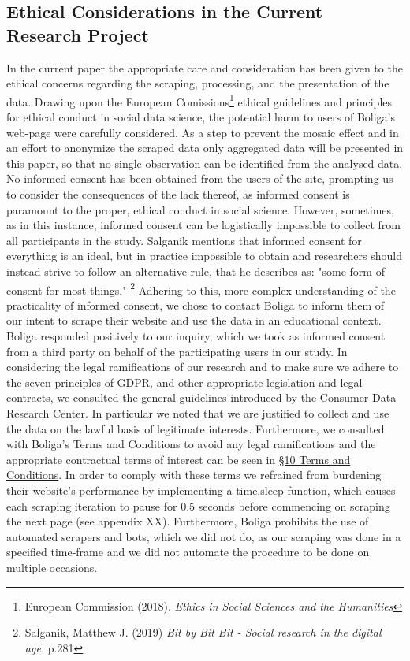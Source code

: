 \documentclass[12pt,a4paper]{article}
\begin{document}
\subsection{Ethical Considerations in the Current Research Project}
In the current paper the appropriate care and consideration has been given to the ethical concerns regarding the scraping, processing, and the presentation of the data. Drawing upon the European Comissions\footnote{European Commission (2018). \textit{Ethics in Social Sciences and the Humanities}} ethical guidelines and principles for ethical conduct in social data science, the potential harm to users of Boliga's web-page were carefully considered. As a step to prevent the mosaic effect and in an effort to anonymize the scraped data only aggregated data will be presented in this paper, so that no single observation can be identified from the analysed data.\newline
No informed consent has been obtained from the users of the site, prompting us to consider the consequences of the lack thereof, as informed consent is paramount to the proper, ethical conduct in social science. However, sometimes, as in this instance, informed consent can be logistically impossible to collect from all participants in the study. Salganik mentions that informed consent for everything is an ideal, but in practice impossible to obtain and researchers should instead strive to follow an alternative rule, that he describes as: "some form of consent for most things." \footnote{Salganik, Matthew J. (2019) \textit{Bit by Bit Bit - Social research in the digital age.} p.281} Adhering to this, more complex  understanding of the practicality of informed consent, we chose to contact Boliga to inform them of our intent to scrape their website and use the data in an educational context. Boliga responded positively to our inquiry, which we took as informed consent from a third party on behalf of the participating users in our study.\newline
In considering the legal ramifications of our research and to make sure we adhere to the seven principles of GDPR, and other appropriate legislation and legal contracts, we consulted the general guidelines introduced by the Consumer Data Research Center. In particular we noted that we are justified to collect and use the data on the lawful basis of legitimate interests. Furthermore, we consulted with Boliga's Terms and Conditions to avoid any legal ramifications and the appropriate contractual terms of interest can be seen in \href{https://www.boliga.dk/vilkaar-og-betingelser}{§10 Terms and Conditions}. In order to comply with these terms we refrained from burdening their website's performance by implementing a time.sleep function, which causes each scraping iteration to pause for 0.5 seconds before commencing on scraping the next page (see appendix XX). Furthermore, Boliga prohibits the use of automated scrapers and bots, which we did not do, as our scraping was done in a specified time-frame and we did not automate the procedure to be done on multiple occasions.
\end{document}

